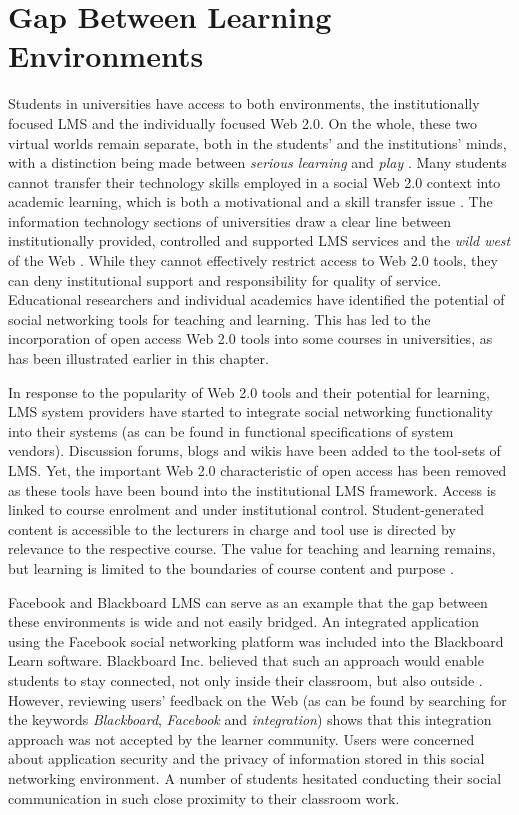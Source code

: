 \section{Gap Between Learning Environments}
Students in universities have access to both environments, the institutionally
focused LMS and the individually focused Web 2.0. On the whole, these two
virtual worlds remain separate, both in the students' and the institutions'
minds, with a distinction being made between \textit{serious learning} and
\textit{play} \citep{Freire2008}. Many students cannot transfer their technology
skills employed in a social Web 2.0 context into academic learning, which is
both a motivational and a skill transfer issue \citep{Katz2005}. The information
technology sections of universities draw a clear line between institutionally
provided, controlled and supported LMS services and the \textit{wild west} of
the Web \citep{Havenstein2007a}. While they cannot effectively restrict access
to Web 2.0 tools, they can deny institutional support and responsibility for
quality of service. Educational researchers and individual academics have
identified the potential of social networking tools for teaching and learning.
This has led to the incorporation of open access Web 2.0 tools into some courses
in universities, as has been illustrated earlier in this chapter.

In response to the popularity of Web 2.0 tools and their potential for learning,
LMS system providers have started to integrate social networking functionality
into their systems (as can be found in functional specifications of system
vendors). Discussion forums, blogs and wikis have been added to the tool-sets of
LMS. Yet, the important Web 2.0 characteristic of open access has been removed
as these tools have been bound into the institutional LMS framework. Access is
linked to course enrolment and under institutional control. Student-generated
content is accessible to the lecturers in charge and tool use is directed by
relevance to the respective course. The value for teaching and learning remains,
but learning is limited to the boundaries of course content and purpose
\citep{Mott2010}.

Facebook and Blackboard LMS can serve as an example that the gap between
these environments is wide and not easily bridged. An integrated application
using the Facebook social networking platform was included into the Blackboard
Learn software. Blackboard Inc. believed that such an approach would enable
students to stay connected, not only inside their classroom, but also outside
\citep{BlackboardInc.2009}. However, reviewing users' feedback on the Web (as
can be found by searching for the keywords \textit{Blackboard},
\textit{Facebook} and \textit{integration}) shows that this integration approach
was not accepted by the learner community. Users were concerned about
application security and the privacy of information stored in this social
networking environment. A number of students hesitated conducting their social
communication in such close proximity to their classroom work. 

